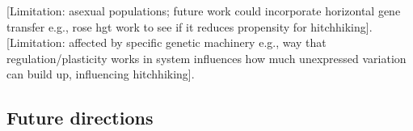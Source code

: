 [Limitation: asexual populations; future work could incorporate horizontal gene transfer e.g., rose hgt work to see if it reduces propensity for hitchhiking].
[Limitation: affected by specific genetic machinery e.g., way that regulation/plasticity works in system influences how much unexpressed variation can build up, influencing hitchhiking].





\subsection{Future directions}



